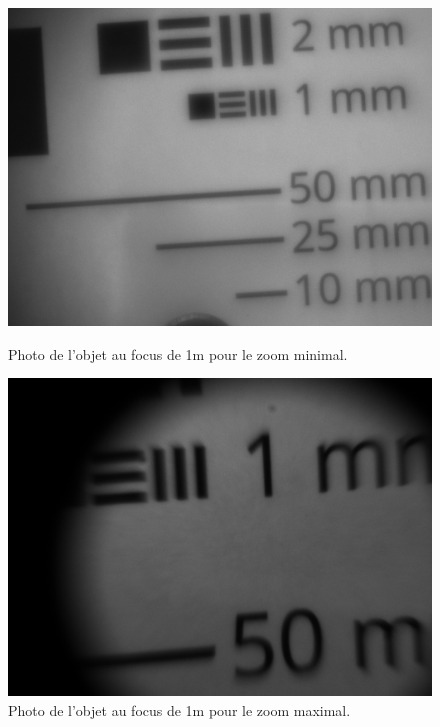 \documentclass[11pt,letterpaper]{article}
\begin{document}
\begin{figure}[h!]
    \centering
    \begin{minipage}[t]{0.47\linewidth}
        \centering
        \includegraphics[scale=0.22]{res_1m_min.png}
        \caption{Photo de l'objet au focus de 1m pour le zoom minimal.}
        \label{res_min}
    \end{minipage}\hfill
    \begin{minipage}[t]{0.5\linewidth}
        \centering
        \includegraphics[scale=0.22]{res_1m_max.png}
        \caption{Photo de l'objet au focus de 1m pour le zoom maximal.}
        \label{res_max}
    \end{minipage}
\end{figure}
\end{document}
